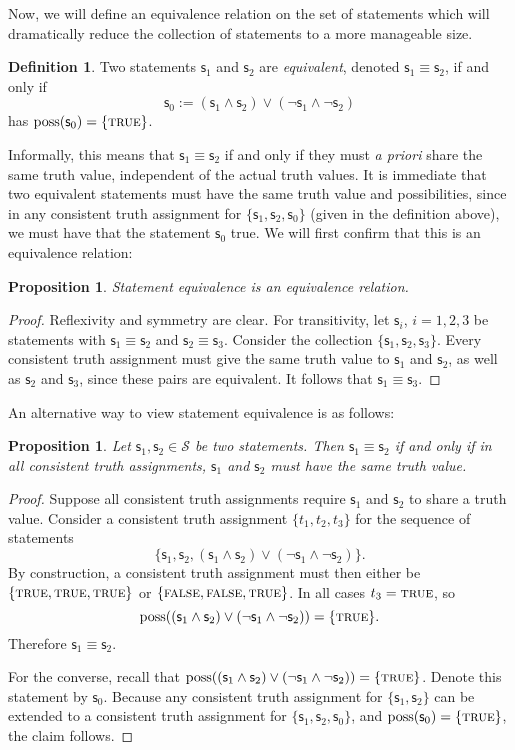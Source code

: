 \documentclass[psamsfonts]{amsart}
\newtheorem{prop}[thm]{Proposition}
\theoremstyle{definition}
\newtheorem{defn}[thm]{Definition}
\theoremstyle{remark}
\numberwithin{equation}{section}
\DeclareMathOperator{\possFn}{poss}
\def\TRUE{\textsc{true}}
\def\FALSE{\textsc{false}}
\def\AND{\wedge}
\def\OR{\vee}
\def\NOT{\neg}
\newcommand{\stmt}[1][s] {\mathsf{#1}}
\begin{document}
Now, we will define an equivalence relation on the set of statements which will dramatically reduce the collection of statements to a more manageable size. 

\begin{defn}
Two statements $\stmt_1$ and $\stmt_2$ are \emph{equivalent}, denoted $\stmt_1 \equiv \stmt_2$, if and only if $$\stmt_0:=(\stmt_1 \AND \stmt_2) \OR (\NOT\stmt_1 \AND \NOT\stmt_2)$$ has $\possFn(\stmt_0)=\{\TRUE\}$. 
\end{defn}

Informally, this means that $\stmt_1\equiv\stmt_2$ if and only if they must \emph{a priori} share the same truth value, independent of the actual truth values. It is immediate that two equivalent statements must have the same truth value and possibilities, since in any consistent truth assignment for $\{\stmt_1,\stmt_2,\stmt_0\}$ (given in the definition above), we must have that the statement $\stmt_0$ true. We will first confirm that this is an equivalence relation:

\begin{prop}
Statement equivalence is an equivalence relation.
\end{prop}
\begin{proof}
Reflexivity and symmetry are clear. For transitivity, let $\stmt_i$, $i=1,2,3$ be statements with $\stmt_1\equiv\stmt_2$ and $\stmt_2\equiv\stmt_3$. Consider the collection $\{\stmt_1,\stmt_2,\stmt_3\}$. Every consistent truth assignment must give the same truth value to $\stmt_1$ and $\stmt_2$, as well as $\stmt_2$ and $\stmt_3$, since these pairs are equivalent. It follows that $\stmt_1\equiv\stmt_3$. 
\end{proof}

An alternative way to view statement equivalence is as follows: 

\begin{prop}\label{prop_equivalent_is_iff}
	Let $\stmt_1, \stmt_2 \in \mathcal{S}$ be two statements. Then $\stmt_1\equiv\stmt_2$ if and only if in all consistent truth assignments, $\stmt_1$ and $\stmt_2$ must have the same truth value.
\end{prop}

\begin{proof}
Suppose all consistent truth assignments require $\stmt_1$ and $\stmt_2$ to share a truth value. Consider a consistent truth assignment $\{t_1, t_2, t_3\}$ for the sequence of statements $$\{\stmt_1, \stmt_2, (\stmt_1 \AND \stmt_2) \OR (\NOT\stmt_1 \AND \NOT\stmt_2)\}.$$ By construction, a consistent truth assignment must then either be $\{\TRUE, \TRUE, \TRUE\}$ or $\{\FALSE, \FALSE, \TRUE\}$. In all cases $t_3=\TRUE$, so $$\possFn((\stmt_1 \AND \stmt_2) \OR (\NOT\stmt_1 \AND \NOT\stmt_2)) = \{\TRUE\}.$$ Therefore $\stmt_1 \equiv \stmt_2$.

For the converse, recall that $\possFn((\stmt_1 \AND \stmt_2) \OR (\NOT\stmt_1 \AND \NOT\stmt_2)) = \{\TRUE\}$. Denote this statement by $\stmt_0$. Because any consistent truth assignment for $\{\stmt_1,\stmt_2\}$ can be extended to a consistent truth assignment for $\{\stmt_1,\stmt_2,\stmt_0\}$, and $\possFn(\stmt_0)=\{\TRUE\}$, the claim follows. 
\end{proof}
\end{document}
